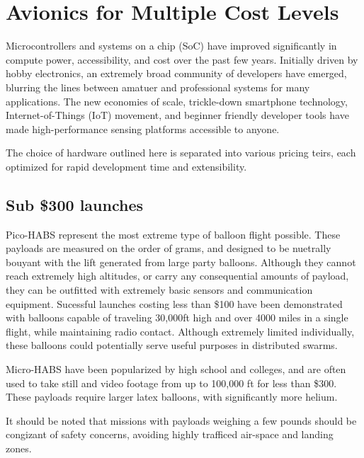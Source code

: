 \documentclass[heading.tex]{subfiles}
\begin{document}
\section{Avionics for Multiple Cost Levels}

Microcontrollers and systems on a chip (SoC) have improved significantly in 
compute power, accessibility, and cost over the past few years.
Initially driven by hobby electronics, an extremely broad community of developers
have emerged, blurring the lines between amatuer and professional systems for
many applications. The new economies of scale, trickle-down smartphone
technology, Internet-of-Things (IoT) movement, and beginner friendly developer
tools have made high-performance sensing platforms accessible to anyone.

The choice of hardware outlined here is separated into various pricing teirs,
each optimized for rapid development time and extensibility.
\subsection{Sub \$300 launches}

Pico-HABS represent the most extreme type of balloon flight possible.
These payloads are measured on the order of grams, and designed to be nuetrally
bouyant with the lift generated from large party balloons. Although they cannot
reach extremely high altitudes, or carry any consequential amounts of payload,
they can be outfitted with extremely basic sensors and communication equipment.
Sucessful launches costing less than \$100 have been demonstrated with balloons
capable of traveling 30,000ft high and over 4000 miles in a single flight,
while maintaining radio contact.
\cite{Leo} \cite{Amsat}
Although extremely limited individually,
these balloons could potentially serve useful purposes in distributed swarms.

Micro-HABS have been popularized by high school and colleges, and are often used
to take still and video footage from up to 100,000 ft for less
than \$300. These payloads require larger latex balloons, with significantly
more helium. 

It should be noted that missions with payloads weighing a few pounds
should be congizant of safety concerns,
avoiding highly trafficed air-space and landing zones.
\end{document}
